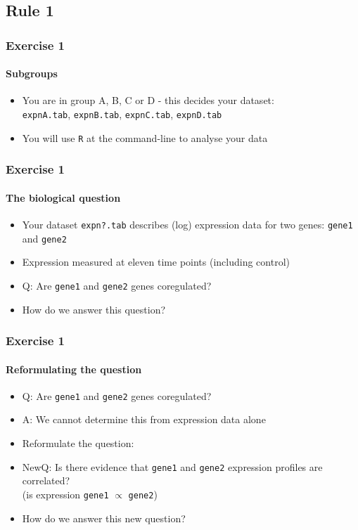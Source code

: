 \documentclass[table]{beamer}
\begin{document}
  
  \subsection{Rule 1}
  \begin{frame}
    \frametitle{Exercise 1}
    \framesubtitle{Subgroups}
    \begin{itemize}
      \item You are in group A, B, C or D - this decides your dataset: \\
      \texttt{expnA.tab}, \texttt{expnB.tab}, \texttt{expnC.tab}, \texttt{expnD.tab}
      \item You will use \texttt{R} at the command-line to analyse your data
    \end{itemize}
  \end{frame}
  
  \begin{frame}
    \frametitle{Exercise 1}
    \framesubtitle{The biological question}
    \begin{itemize}
      \item Your dataset \texttt{expn?.tab} describes (log) expression data for two genes: \texttt{gene1} and \texttt{gene2}
      \item Expression measured at eleven time points (including control)
      \item Q: Are \texttt{gene1} and \texttt{gene2} genes coregulated?
      \item How do we answer this question?
    \end{itemize}
  \end{frame}  

  \begin{frame}
    \frametitle{Exercise 1}
    \framesubtitle{Reformulating the question}
    \begin{itemize}
      \item<1-> Q: Are \texttt{gene1} and \texttt{gene2} genes coregulated?
      \item<1-> A: We cannot determine this from expression data alone
      \item<2-> Reformulate the question:
      \item<2-> NewQ: Is there evidence that \texttt{gene1} and \texttt{gene2} expression profiles are correlated? \\
            (is expression \texttt{gene1} $\propto$ \texttt{gene2})
      \item<2-> How do we answer this new question?
    \end{itemize}
  \end{frame}
\end{document}
